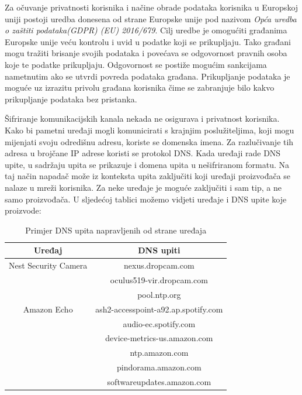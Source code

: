 \documentclass[times, utf8, diplomski]{fer}
\begin{document}
Za očuvanje privatnosti korisnika i načine obrade podataka korisnika u Europskoj uniji postoji uredba donesena od strane Europske unije pod nazivom \emph{Opća uredba o zaštiti podataka(GDPR) (EU) 2016/679}\citep{GDPR}. Cilj uredbe je omogućiti građanima Europske unije veću kontrolu i uvid u podatke koji se prikupljaju. Tako građani mogu tražiti brisanje svojih podataka i povećava se odgovornost pravnih osoba koje te podatke prikupljaju. Odgovornost se postiže mogućim sankcijama nametnutim ako se utvrdi povreda podataka građana. Prikupljanje podataka je moguće uz izrazitu privolu građana korisnika čime se zabranjuje bilo kakvo prikupljanje podataka bez pristanka. 

Šifriranje komunikacijskih kanala nekada ne osigurava i privatnost korisnika. Kako bi pametni uređaji mogli komunicirati s krajnjim poslužiteljima, koji mogu mijenjati svoju odredišnu adresu, koriste se domenska imena. Za razlučivanje tih adresa u brojčane IP adrese koristi se protokol DNS. Kada uređaji rade DNS upite, u sadržaju upita se prikazuje i domena upita u nešifriranom formatu. Na taj način napadač može iz konteksta upita zaključiti koji uređaji proizvođača se nalaze u mreži korisnika. Za neke uređaje je moguće zaključiti i sam tip, a ne samo proizvođača. U sljedećoj tablici možemo vidjeti uređaje i DNS upite koje proizvode:

\begin{table}[h]
    \centering
    \caption{Primjer DNS upita napravljenih od strane uređaja \citep{Apthorpe2017May}}
    \begin{tabular}{| c | c |} 
    \hline
    \textbf{Uređaj} & \textbf{DNS upiti} \\
    \hline\hline
    Nest Security Camera & nexus.dropcam.com \\
     & oculus519-vir.dropcam.com \\
     & pool.ntp.org \\
    \hline
    Amazon Echo & ash2-accesspoint-a92.ap.spotify.com \\ 
     & audio-ec.spotify.com \\ 
     & device-metrics-us.amazon.com \\ 
     & ntp.amazon.com \\ 
     & pindorama.amazon.com \\ 
     & softwareupdates.amazon.com \\
    \hline
    \end{tabular}
    \label{tab:confusion}
\end{table} 
\end{document}

